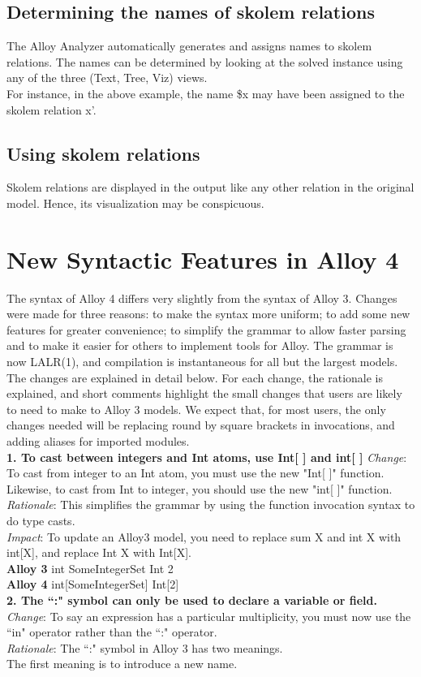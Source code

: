 \documentclass[a4paper,12pt]{extarticle}
\begin{document}
\subsection{Determining the names of skolem relations }
\label{determine skolem relations}
The Alloy Analyzer automatically generates and assigns names to skolem relations.
The names can be determined by looking at the solved instance using any of the three (Text, Tree, Viz) views.\\
For instance, in the above example, the name \$x may have been assigned to the skolem relation x'. 
\subsection{Using skolem relations }
\label{Use of skolem relations}
Skolem relations are displayed in the output like any other relation in the original model. Hence, its visualization may be conspicuous.
\section{New Syntactic Features in Alloy 4 }
\label{Features of Alloy}
The syntax of Alloy 4 differs very slightly from the syntax of Alloy 3. Changes were made for three reasons: to make the syntax more uniform; to add some new features for greater convenience; to simplify the grammar to allow faster parsing and to make it easier for others to implement tools for Alloy. The grammar is now LALR(1), and compilation is instantaneous for all but the largest models. \\
The changes are explained in detail below. For each change, the rationale is explained, and short comments highlight the small changes that users are likely to need to make to Alloy 3 models. We expect that, for most users, the only changes needed will be replacing round by square brackets in invocations, and adding aliases for imported modules. \\
\textbf{1. To cast between integers and Int atoms, use Int[ ] and int[ ]} 
\textit{Change}: To cast from integer to an Int atom, you must use the new "Int[ ]" function.\\
Likewise, to cast from Int to integer, you should use the new "int[ ]" function. \\
\textit{Rationale}: This simplifies the grammar by using the function invocation syntax to do type casts. \\
\textit{Impact}: To update an Alloy3 model, you need to replace sum X and int X with int[X], and replace Int X with Int[X]. \\
\textbf{Alloy 3}  int SomeIntegerSet  Int 2 \\
\textbf{Alloy 4}  int[SomeIntegerSet] Int[2] \\
\textbf{2. The ``:" symbol can only be used to declare a variable or field.} \\
\textit{Change}: To say an expression has a particular multiplicity, you must now use the ``in" operator rather than the ``:" operator. \\
\textit{Rationale}: The ``:" symbol in Alloy 3 has two meanings.\\
The first meaning is to introduce a new name.\\
\end{document}
